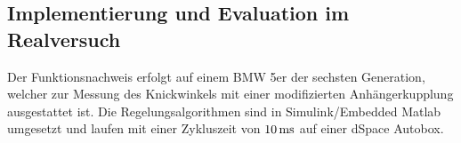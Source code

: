 

\subsection{Implementierung und Evaluation im Realversuch}\label{sec:eval_trailer}
Der Funktionsnachweis erfolgt auf einem BMW 5er der sechsten Generation, %
welcher zur Messung des Knickwinkels mit einer modifizierten Anhängerkupplung ausgestattet ist. Die Regelungsalgorithmen sind in Simulink/Embedded Matlab umgesetzt und laufen mit einer Zykluszeit von $\unit[10]{ms}$ auf einer dSpace Autobox.


